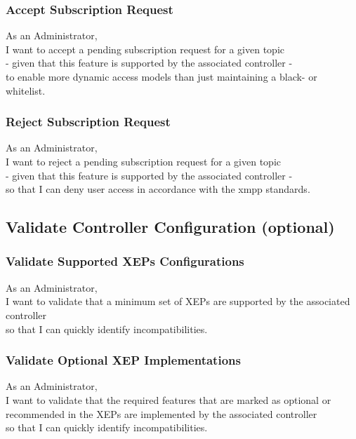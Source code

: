\subsubsection{Accept Subscription Request}

As an Administrator,\\
I want to accept a pending subscription request for a given topic\\
- given that this feature is supported by the associated controller -\\
to enable more dynamic access models than just maintaining a black- or whitelist.

\subsubsection{Reject Subscription Request}

As an Administrator,\\
I want to reject a pending subscription request for a given topic\\
- given that this feature is supported by the associated controller -\\
so that I can deny user access in accordance with the \gls{xmpp} standards.

\subsection{Validate Controller Configuration (optional)}\label{sec:validate-controller-config}

\subsubsection{Validate Supported XEPs Configurations}
As an Administrator,\\
I want to validate that a minimum set of XEPs are supported by the associated controller\\
so that I can quickly identify incompatibilities.

\subsubsection{Validate Optional XEP Implementations}
As an Administrator,\\
I want to validate that the required features that are marked as optional or recommended in the XEPs are implemented by the associated controller\\
so that I can quickly identify incompatibilities.

